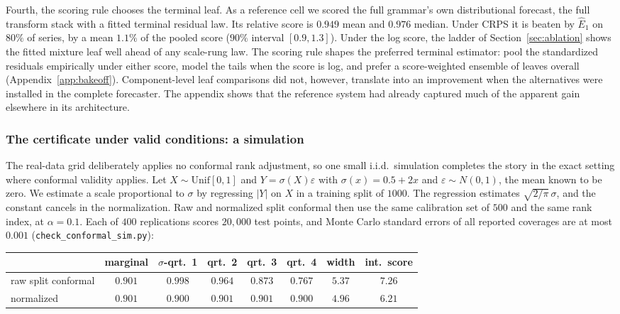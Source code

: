 \documentclass[11pt]{article}
\theoremstyle{remark}
\begin{document}
Fourth, the scoring rule chooses the terminal leaf. As a reference cell we scored the full
grammar's own distributional forecast, the full transform stack with a fitted terminal
residual law. Its relative score is $0.949$ mean and $0.976$ median. Under
CRPS it is beaten by $\widehat E_1$ on $80\%$ of series, by a mean $1.1\%$ of the pooled
score ($90\%$ interval $[0.9,1.3]$). Under the log score, the ladder of
Section~\ref{sec:ablation} shows the fitted mixture leaf well ahead of any scale-rung law.
The scoring rule shapes the preferred terminal estimator: pool the standardized residuals
empirically under either score, model the tails when the score is log, and prefer a
score-weighted ensemble of leaves overall (Appendix~\ref{app:bakeoff}). Component-level
leaf comparisons did not, however, translate into an improvement when the alternatives were
installed in the complete forecaster. The appendix shows that the reference system had
already captured much of the apparent gain elsewhere in its architecture.

\subsubsection*{The certificate under valid conditions: a simulation}

The real-data grid deliberately applies no conformal rank adjustment, so one small i.i.d.\
simulation completes the story in the exact setting where conformal validity applies. Let
$X\sim\mathrm{Unif}[0,1]$ and $Y=\sigma(X)\varepsilon$ with $\sigma(x)=0.5+2x$ and
$\varepsilon\sim N(0,1)$, the mean known to be zero. We estimate a scale proportional to $\sigma$ by regressing $|Y|$ on $X$ in a training split
of $1000$. The regression estimates $\sqrt{2/\pi}\,\sigma$, and the constant cancels in
the normalization. Raw and normalized split conformal then use the same calibration set of
$500$ and the same rank index, at $\alpha=0.1$. Each of $400$ replications scores $20{,}000$
test points, and Monte Carlo standard errors of all reported coverages are at most $0.001$
(\texttt{check\_conformal\_sim.py}):

\begin{center}
\small
\begin{tabular}{lccccccc}
\toprule
 & marginal & $\sigma$-qrt.\ 1 & qrt.\ 2 & qrt.\ 3 & qrt.\ 4 & width & int.\ score\\
\midrule
raw split conformal & $0.901$ & $0.998$ & $0.964$ & $0.873$ & $0.767$ & $5.37$ & $7.26$\\
normalized & $0.901$ & $0.900$ & $0.901$ & $0.901$ & $0.900$ & $4.96$ & $6.21$\\
\bottomrule
\end{tabular}
\end{center}
\end{document}
